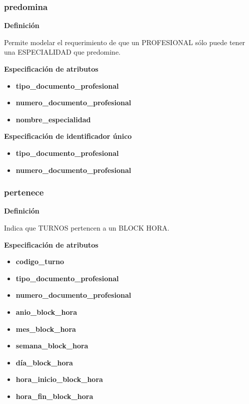 \documentclass[a4paper,11pt]{article}
\begin{document}
\subsubsection{\textbf{predomina}}

\textbf{Definición}

Permite modelar el requerimiento de que un PROFESIONAL sólo puede tener una ESPECIALIDAD 
que predomine.

\textbf{Especificación de atributos}


\begin{itemize}

     \item \textbf{tipo\_documento\_profesional}

     \item \textbf{numero\_documento\_profesional} 
	 
	\item \textbf{nombre\_especialidad}

\end{itemize}

\textbf{Especificación de identificador único}

\begin{itemize}

     \item \textbf{tipo\_documento\_profesional}

     \item \textbf{numero\_documento\_profesional} 

\end{itemize}

\subsubsection{\textbf{pertenece}}

\textbf{Definición}

Indica que TURNOS pertencen a un BLOCK HORA.

\textbf{Especificación de atributos}


\begin{itemize}
	\item \textbf{codigo\_turno}
	\item \textbf{tipo\_documento\_profesional}
           \item \textbf{numero\_documento\_profesional} 
	\item \textbf{anio\_block\_hora} 
	\item \textbf{mes\_block\_hora}
	\item \textbf{semana\_block\_hora}
	\item \textbf{día\_block\_hora} 
	\item \textbf{hora\_inicio\_block\_hora}
	\item \textbf{hora\_fin\_block\_hora}

\end{itemize}
\end{document}
